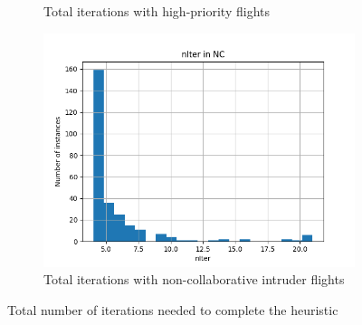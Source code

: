 \documentclass[../../thesis.tex]{subfiles}
\begin{document}
\begin{figure}[ht]
\begin{subfigure}{0.3\textwidth}
        \caption{Total iterations with high-priority flights}
        \label{fig:heurAP:nIter}
    \end{subfigure}
    \hfill
    \begin{subfigure}{0.3\textwidth}
        \centering
        \includegraphics[width=\linewidth]{thesis/picture/heuristic/nIter_histogram_NC.png}
        \caption{Total iterations with non-collaborative intruder flights}
        \label{fig:heurNC:nIter}
    \end{subfigure}
    \caption{Total number of iterations needed to complete the heuristic}
    \label{fig:heur:nIter}
\end{figure}
\end{document}
